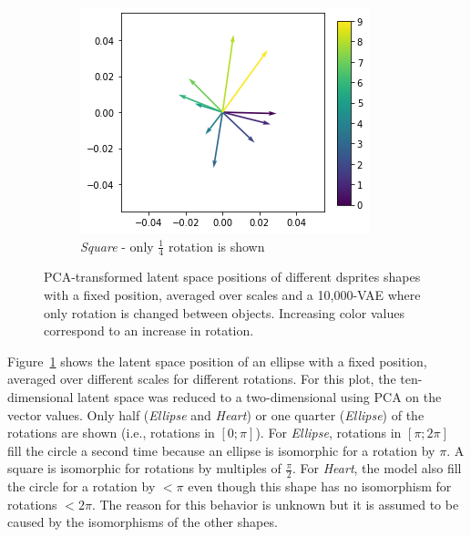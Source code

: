 \begin{figure}
    \hfill
    \begin{subfigure}{.3\textwidth}
        \includegraphics[width=\textwidth]{images/latent_space_traversals/vae_dsprites_orientation_latent_space_square.png}
        \caption{\textit{Square} - only $\frac{1}{4}$ rotation is shown}
    \end{subfigure}
    \caption[10,000-VAE - Rotation latent space]{PCA-transformed latent space positions of different dsprites shapes with a fixed position, averaged over scales and a 10,000-VAE where only rotation is changed between objects. Increasing color values correspond to an increase in rotation. }
    \label{fig:vae_dsprites_rotation_latent_space_vae_10000}
\end{figure}

Figure~\ref{fig:vae_dsprites_rotation_latent_space_vae_10000} shows the latent space position of an ellipse with a fixed position, averaged over different scales for different rotations.
For this plot, the ten-dimensional latent space was reduced to a two-dimensional using \ac{PCA} on the vector values.
Only half (\textit{Ellipse} and \textit{Heart}) or one quarter (\textit{Ellipse}) of the rotations are shown (i.e., rotations in $[0;\pi]$).
For \textit{Ellipse}, rotations in $[\pi; 2\pi]$ fill the circle a second time because an ellipse is isomorphic for a rotation by $\pi$.
A square is isomorphic for rotations by multiples of $\frac{\pi}{2}$.
For \textit{Heart}, the model also fill the circle for a rotation by $< \pi$ even though this shape has no isomorphism for rotations $< 2\pi$.
The reason for this behavior is unknown but it is assumed to be caused by the isomorphisms of the other shapes.

